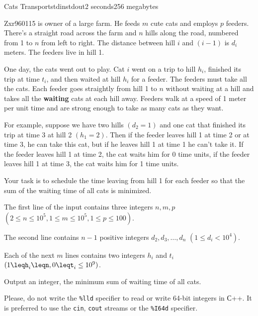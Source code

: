 \begin{problem}{Cats Transport}{stdin}{stdout}{2 seconds}{256 megabytes}

Zxr960115 is owner of a large farm. He feeds $m$ cute cats and employs $p$ feeders. There's a straight road across the farm and $n$ hills along the road, numbered from 1 to $n$ from left to right. The distance between hill $i$ and $(i-1)$ is $d_i$ meters. The feeders live in hill 1.

One day, the cats went out to play. Cat $i$ went on a trip to hill $h_i$, finished its trip at time $t_i$, and then waited at hill $h_i$ for a feeder. The feeders must take all the cats. Each feeder goes straightly from hill 1 to $n$ without waiting at a hill and takes all the \textbf{waiting} cats at each hill away. Feeders walk at a speed of 1 meter per unit time and are strong enough to take as many cats as they want.

For example, suppose we have two hills $(d_2 = 1)$ and one cat that finished its trip at time 3 at hill 2 $(h_1 = 2)$. Then if the feeder leaves hill 1 at time 2 or at time 3, he can take this cat, but if he leaves hill 1 at time 1 he can't take it. If the feeder leaves hill 1 at time 2, the cat waits him for 0 time units, if the feeder leaves hill 1 at time 3, the cat waits him for 1 time units.

Your task is to schedule the time leaving from hill 1 for each feeder so that the sum of the waiting time of all cats is minimized.

\InputFile
The first line of the input contains three integers $n, m, p$ $(2 \leq n \leq 10^5, 1 \leq m \leq 10^5, 1 \leq p \leq 100)$.

The second line contains $n-1$ positive integers $d_2, d_3, \dots, d_n$ $(1 \le d_i < 10^4)$.

Each of the next $m$ lines contains two integers $h_i$ and $t_i$ $(1\leqh_i\leqn, 0\leqt_i\leq10^9)$.


\OutputFile
Output an integer, the minimum sum of waiting time of all cats.

Please, do not write the \texttt{\%lld} specifier to read or write 64-bit integers in С++. It is preferred to use the \texttt{cin}, \texttt{cout} streams or the \texttt{\%I64d} specifier.


\Examples

\begin{example}
%
\end{example}

\end{problem}
